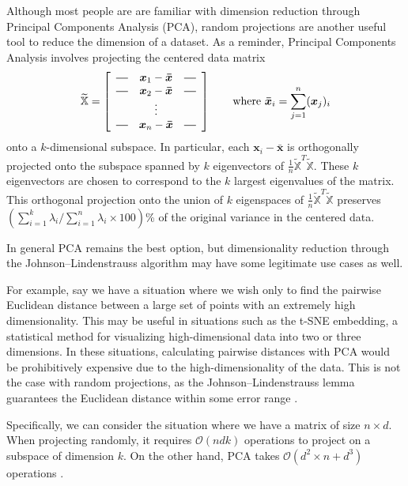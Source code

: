 \documentclass{article}
\newcommand*{\horzbar}{\rule[.5ex]{2.5ex}{0.5pt}}
\begin{document}
Although most people are are familiar with dimension reduction through Principal Components Analysis (PCA), random projections are another useful tool to reduce the dimension of a dataset. As a reminder, Principal Components Analysis involves projecting the centered data matrix
\begin{align*}
\widetilde{\mathbb{X}} = 
        \left[
            \begin{array}{ccc}
            \horzbar & \boldsymbol{x}_1 - \boldsymbol{\bar{x}} & \horzbar \\
            \horzbar & \boldsymbol{x}_2 - \boldsymbol{\bar{x}} & \horzbar \\
            & \vdots &  \\
            \horzbar & \boldsymbol{x}_n - \boldsymbol{\bar{x}} & \horzbar
            \end{array}
        \right] \qquad \text{where} \ \boldsymbol{\bar{x}}_i = \sum_{j=1}^n (\boldsymbol{x}_j)_i
\end{align*}
onto a $k$-dimensional subspace. In particular, each $\boldsymbol{x}_i - \boldsymbol{\bar{x}}$ is orthogonally projected onto the subspace spanned by $k$ eigenvectors of $\frac{1}{n}\widetilde{\mathbb{X}}^T\widetilde{\mathbb{X}}$. These $k$ eigenvectors are chosen to correspond to the $k$ largest eigenvalues of the matrix. This orthogonal projection onto the union of $k$ eigenspaces of $\frac{1}{n}\widetilde{\mathbb{X}}^T\widetilde{\mathbb{X}}$ preserves $(\sum_{i=1}^k \lambda_i/\sum_{i=1}^n \lambda_i \times 100)$\% of the original variance in the centered data.   

In general PCA remains the best option, but dimensionality reduction through the Johnson–Lindenstrauss algorithm may have some legitimate use cases as well.

For example, say we have a situation where we wish only to find the pairwise Euclidean distance between a large set of points with an extremely high dimensionality. This may be useful in situations such as the t-SNE embedding, a statistical method for visualizing high-dimensional data into two or three dimensions. In these situations, calculating pairwise distances with PCA would be prohibitively expensive due to the high-dimensionality of the data. This is not the case with random projections, as the Johnson–Lindenstrauss lemma guarantees the Euclidean distance within some error range \cite{stackoverflowpca}.

Specifically, we can consider the situation where we have a matrix of size $n \times d$. When projecting randomly, it requires $\mathcal{O}(ndk)$ operations to project on a subspace of dimension $k$. On the other hand, PCA takes $\mathcal{O}(d^2 \times n+d^3)$ operations \cite{stackoverflowpca}.
\end{document}
